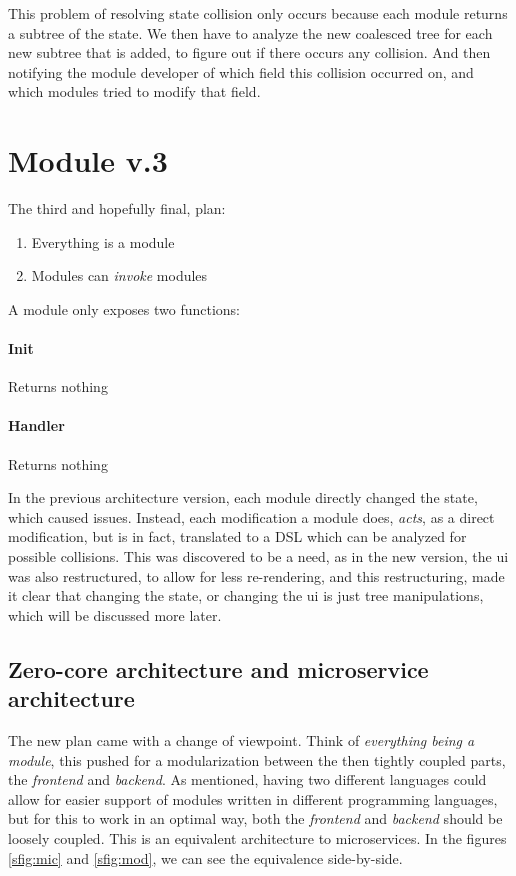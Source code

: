 This problem of resolving state collision only occurs because each module
returns a subtree of the state. We then have to analyze the new coalesced tree
for each new subtree that is added, to figure out if there occurs any collision.
And then notifying the module developer of which field this collision occurred
on, and which modules tried to modify that field.

\section{Module v.3} \label{sec:moD3}

The third and hopefully final, plan:

\begin{enumerate}
  \item Everything is a module
  \item Modules can \textit{invoke} modules
\end{enumerate}

A module only exposes two functions:

\paragraph{Init} Returns nothing

\paragraph{Handler} Returns nothing

In the previous architecture version, each module directly changed the state,
which caused issues. Instead, each modification a module does, \textit{acts}, as
a direct modification, but is in fact, translated to a DSL which can be analyzed
for possible collisions. This was discovered to be a need, as in the new
version, the \gls*{ui} was also restructured, to allow for less re-rendering, and
this restructuring, made it clear that changing the state, or changing the
\gls*{ui} is just tree manipulations, which will be discussed more later.

\subsection{Zero-core architecture and microservice architecture}

The new plan came with a change of viewpoint. Think of
\textit{everything being a module}, this pushed for a modularization between the
then tightly coupled parts, the \textit{frontend} and \textit{backend}. As
mentioned, having two different languages could allow for easier support of
modules written in different programming languages, but for this to work in an
optimal way, both the \textit{frontend} and \textit{backend} should be loosely
coupled. This is an equivalent architecture to microservices. In the figures
\ref{sfig:mic} and \ref{sfig:mod}, we can see the equivalence side-by-side.

